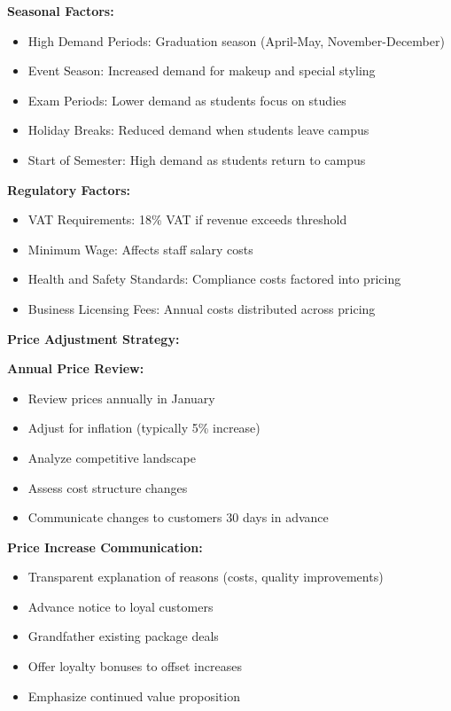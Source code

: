 \textbf{Seasonal Factors:}
\begin{itemize}[leftmargin=2em]
    \item High Demand Periods: Graduation season (April-May, November-December)
    \item Event Season: Increased demand for makeup and special styling
    \item Exam Periods: Lower demand as students focus on studies
    \item Holiday Breaks: Reduced demand when students leave campus
    \item Start of Semester: High demand as students return to campus
\end{itemize}

\textbf{Regulatory Factors:}
\begin{itemize}[leftmargin=2em]
    \item VAT Requirements: 18\% VAT if revenue exceeds threshold
    \item Minimum Wage: Affects staff salary costs
    \item Health and Safety Standards: Compliance costs factored into pricing
    \item Business Licensing Fees: Annual costs distributed across pricing
\end{itemize}

\vspace{1em}

\textbf{Price Adjustment Strategy:}

\textbf{Annual Price Review:}
\begin{itemize}[leftmargin=2em]
    \item Review prices annually in January
    \item Adjust for inflation (typically 5\% increase)
    \item Analyze competitive landscape
    \item Assess cost structure changes
    \item Communicate changes to customers 30 days in advance
\end{itemize}

\textbf{Price Increase Communication:}
\begin{itemize}[leftmargin=2em]
    \item Transparent explanation of reasons (costs, quality improvements)
    \item Advance notice to loyal customers
    \item Grandfather existing package deals
    \item Offer loyalty bonuses to offset increases
    \item Emphasize continued value proposition
\end{itemize}

